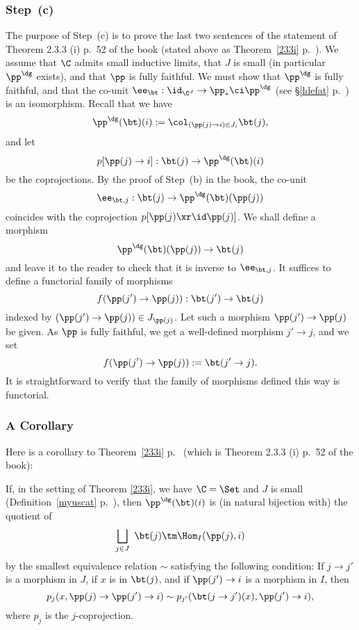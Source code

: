 \documentclass[12pt]{article}
\theoremstyle{remark}
\theoremstyle{definition}
\begin{document}
\subsubsection{Step~(c)}

The purpose of Step~(c) is to prove the last two sentences of the statement of Theorem 2.3.3 (i) p.~52 of the book (stated above as Theorem~\ref{233i} p.~). We assume that $\C$ admits small inductive limits, that $J$ is small (in particular $\pp^\dg$ exists), and that $\pp$ is fully faithful. We must show that $\pp^\dg$ is fully faithful, and that the co-unit $\ee_\bt:\id_{\C^J}\to\pp_*\ci\pp^\dg$ (see \S\ref{ldefat} p.~) is an isomorphism. %
Recall that we have 
$$
\pp^\dg(\bt)(i):=\col_{(\pp(j)\to i)\in J_i}\bt(j),
$$ 
and let 
$$
p[\pp(j)\to i]:\bt(j)\to\pp^\dg(\bt)(i)
$$ 
be the coprojections. By the proof of Step~(b) in the book, the co-unit 
$$
\ee_{\bt,j}:\bt(j)\to\pp^\dg(\bt)(\pp(j))
$$ 
coincides with the coprojection $p[\pp(j)\xr\id\pp(j)]$. We shall define a morphism $$\pp^\dg(\bt)(\pp(j))\to\bt(j)$$ and leave it to the reader to check that it is inverse to $\ee_{\bt,j}$. It suffices to define a functorial family of morphisms 
$$
f(\pp(j')\to\pp(j)):\bt(j')\to\bt(j)
$$ 
indexed by $(\pp(j')\to\pp(j))\in J_{\pp(j)}$. Let such a morphism $\pp(j')\to\pp(j)$ be given. As $\pp$ is fully faithful, we get a well-defined morphism $j'\to j$, and we set 
$$
f(\pp(j')\to\pp(j)):=\bt(j'\to j).
$$ 
It is straightforward to verify that the family of morphisms defined this way is functorial.



\subsubsection{A Corollary}

Here is a corollary to Theorem~\ref{233i} p.~ (which is Theorem 2.3.3 (i) p.~52 of the book):

\begin{cor}
If, in the setting of Theorem \ref{233i}, we have $\C=\Set$ and $J$ is small (Definition~\ref{myuscat} p.~), then $\pp^\dg(\bt)(i)$ is (in natural bijection with) the quotient of 
$$
\bigsqcup_{j\in J}\ \bt(j)\tm\Hom_I(\pp(j),i) 
$$ 
by the smallest equivalence relation $\sim$ satisfying the following condition: If $j\to j'$ is a morphism in $J$, if $x$ is in $\bt(j)$, and if $\pp(j')\to i$ is a morphism in $I$, then 
$$
p_j(x,\pp(j)\to\pp(j')\to i)\sim p_{j'}(\bt(j\to j')(x),\pp(j')\to i),
$$ 
where $p_j$ is the $j$-coprojection. 
\end{cor}
\end{document}
